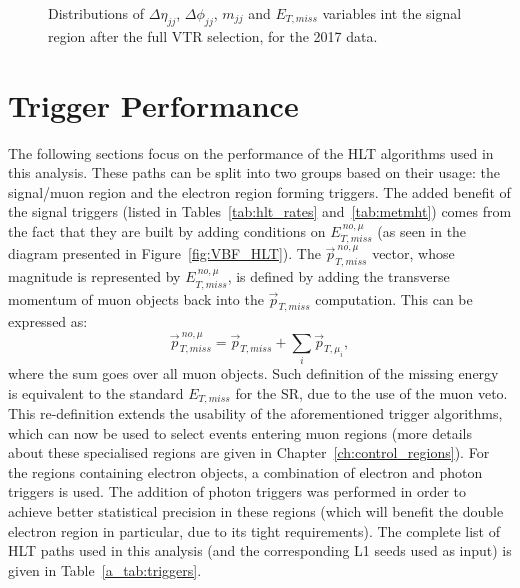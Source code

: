 \begin{figure}[htbp]
{    }
  \caption{Distributions of $\Delta \eta_{jj}$, $\Delta \phi_{jj}$, $m_{jj}$ and $E_{T,miss}$ variables int the signal region after the full VTR selection, for the 2017 data.}
  \label{fig:VTR_SR_2017}
\end{figure}


\section{Trigger Performance}

\hspace{10pt} The following sections focus on the performance of the HLT algorithms used in this analysis. These paths can be split into two groups based on their usage: the signal/muon region and the electron region forming triggers. The added benefit of the signal triggers (listed in Tables~\ref{tab:hlt_rates} and~\ref{tab:metmht}) comes from the fact that they are built by adding conditions on $E_{T, miss}^{~no, \mu}$ (as seen in the diagram presented in Figure~\ref{fig:VBF_HLT}). The $\vec{p}_{T, miss}^{~no, \mu}$ vector, whose magnitude is represented by $E_{T, miss}^{~no, \mu}$, is defined by adding the transverse momentum of muon objects back into the $\vec{p}_{T, miss}$ computation. This can be expressed as:
\begin{equation}
  \vec{p}_{T, miss}^{~no, \mu} = \vec{p}_{T, miss} + \sum_i \vec{p}_{T,\mu_i},
\end{equation}
where the sum goes over all muon objects. Such definition of the missing energy is equivalent to the standard $E_{T, miss}$ for the SR, due to the use of the muon veto. This re-definition extends the usability of the aforementioned trigger algorithms, which can now be used to select events entering muon regions (more details about these specialised regions are given in Chapter~\ref{ch:control_regions}). For the regions containing electron objects, a combination of electron and photon triggers is used. The addition of photon triggers was performed in order to achieve better statistical precision in these regions (which will benefit the double electron region in particular, due to its tight requirements). The complete list of HLT paths used in this analysis (and the corresponding L1 seeds used as input) is given in Table~\ref{a_tab:triggers}.

